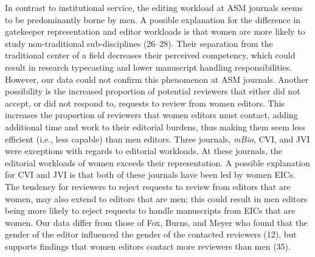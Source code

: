 \documentclass[11pt,]{article}
\begin{document}
In contrast to institutional service, the editing workload at ASM
journals seems to be predominantly borne by men. A possible explanation
for the difference in gatekeeper representation and editor workloads is
that women are more likely to study non-traditional sub-disciplines
(26--28). Their separation from the traditional center of a field
decreases their perceived competency, which could result in research
typecasting and lower manuscript handling responsibilities. However, our
data could not confirm this phenomenon at ASM journals. Another
possibility is the increased proportion of potential reviewers that
either did not accept, or did not respond to, requests to review from
women editors. This increases the proportion of reviewers that women
editors must contact, adding additional time and work to their editorial
burdens, thus making them seem less efficient (i.e., less capable) than
men editors. Three journals, \emph{mBio}, CVI, and JVI were exceptions
with regards to editorial workloads. At these journals, the editorial
workloads of women exceeds their representation. A possible explanation
for CVI and JVI is that both of these journals have been led by women
EICs. The tendency for reviewers to reject requests to review from
editors that are women, may also extend to editors that are men; this
could result in men editors being more likely to reject requests to
handle manuscripts from EICs that are women. Our data differ from those
of Fox, Burns, and Meyer who found that the gender of the editor
influenced the gender of the contacted reviewers (12), but supports
findings that women editors contact more reviewers than men (35).
\end{document}
